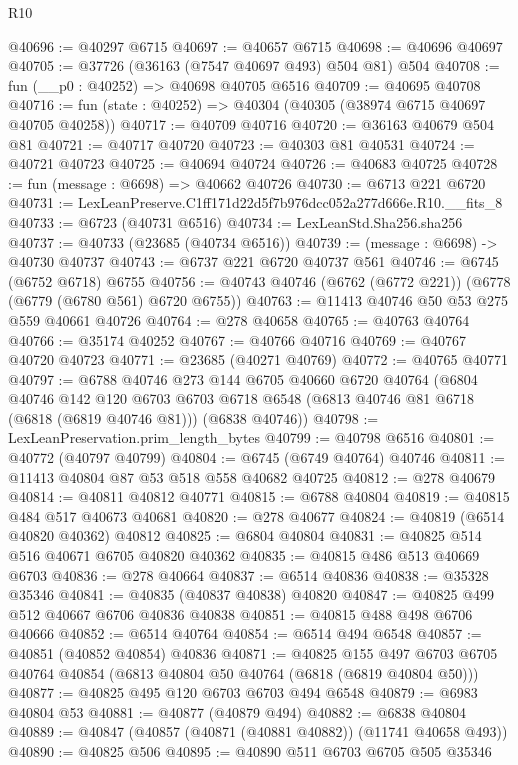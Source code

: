\begin{lexlean}{R10}
\begin{coremodule}
@40696 := @40297 @6715
@40697 := @40657 @6715
@40698 := @40696 @40697
@40705 := @37726 (@36163 (@7547 @40697 @493) @504 @81) @504
@40708 := fun (__p0 : @40252) => @40698 @40705 @6516
@40709 := @40695 @40708
@40716 := fun (state : @40252) => @40304 (@40305 (@38974 @6715 @40697 @40705 @40258))
@40717 := @40709 @40716
@40720 := @36163 @40679 @504 @81
@40721 := @40717 @40720
@40723 := @40303 @81 @40531
@40724 := @40721 @40723
@40725 := @40694 @40724
@40726 := @40683 @40725
@40728 := fun (message : @6698) => @40662 @40726
@40730 := @6713 @221 @6720
@40731 := LexLeanPreserve.C1ff171d22d5f7b976dcc052a277d666e.R10.__fits_8
@40733 := @6723 (@40731 @6516)
@40734 := LexLeanStd.Sha256.sha256
@40737 := @40733 (@23685 (@40734 @6516))
@40739 := (message : @6698) -> @40730 @40737
@40743 := @6737 @221 @6720 @40737 @561
@40746 := @6745 (@6752 @6718) @6755
@40756 := @40743 @40746 (@6762 (@6772 @221)) (@6778 (@6779 (@6780 @561) @6720 @6755))
@40763 := @11413 @40746 @50 @53 @275 @559 @40661 @40726
@40764 := @278 @40658
@40765 := @40763 @40764
@40766 := @35174 @40252
@40767 := @40766 @40716
@40769 := @40767 @40720 @40723
@40771 := @23685 (@40271 @40769)
@40772 := @40765 @40771
@40797 := @6788
    @40746
    @273
    @144
    @6705
    @40660
    @6720
    @40764
    (@6804
      @40746
      @142
      @120
      @6703
      @6703
      @6718
      @6548
      (@6813 @40746 @81 @6718 (@6818 (@6819 @40746 @81)))
      (@6838 @40746))
@40798 := LexLeanPreservation.prim_length_bytes
@40799 := @40798 @6516
@40801 := @40772 (@40797 @40799)
@40804 := @6745 (@6749 @40764) @40746
@40811 := @11413 @40804 @87 @53 @518 @558 @40682 @40725
@40812 := @278 @40679
@40814 := @40811 @40812 @40771
@40815 := @6788 @40804
@40819 := @40815 @484 @517 @40673 @40681
@40820 := @278 @40677
@40824 := @40819 (@6514 @40820 @40362) @40812
@40825 := @6804 @40804
@40831 := @40825 @514 @516 @40671 @6705 @40820 @40362
@40835 := @40815 @486 @513 @40669 @6703
@40836 := @278 @40664
@40837 := @6514 @40836
@40838 := @35328 @35346
@40841 := @40835 (@40837 @40838) @40820
@40847 := @40825 @499 @512 @40667 @6706 @40836 @40838
@40851 := @40815 @488 @498 @6706 @40666
@40852 := @6514 @40764
@40854 := @6514 @494 @6548
@40857 := @40851 (@40852 @40854) @40836
@40871 := @40825
    @155
    @497
    @6703
    @6705
    @40764
    @40854
    (@6813 @40804 @50 @40764 (@6818 (@6819 @40804 @50)))
@40877 := @40825 @495 @120 @6703 @6703 @494 @6548
@40879 := @6983 @40804 @53
@40881 := @40877 (@40879 @494)
@40882 := @6838 @40804
@40889 := @40847 (@40857 (@40871 (@40881 @40882)) (@11741 @40658 @493))
@40890 := @40825 @506
@40895 := @40890 @511 @6703 @6705 @505 @35346

\end{coremodule}
\end{lexlean}
